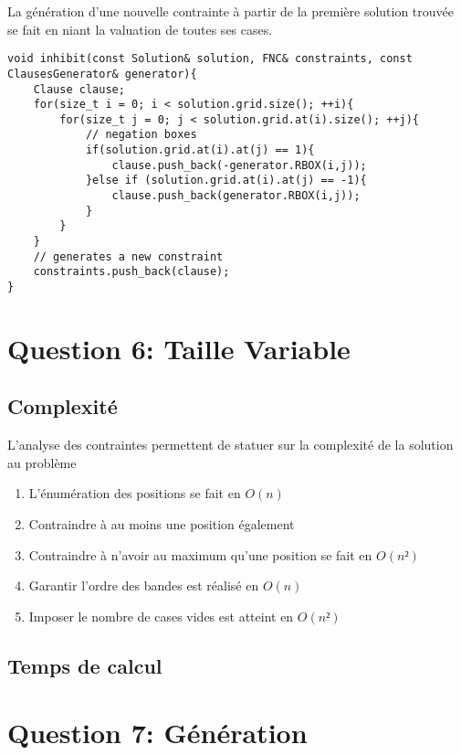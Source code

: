 \documentclass[a4paper,12pt]{report}
\begin{document}
La génération d'une nouvelle contrainte à partir de la première solution trouvée se fait en niant la valuation de toutes ses cases.
\lstset{style=Cpp, caption=Création de la contrainte, label=C:Constraint}
\begin{lstlisting}[mathescape=true]
void inhibit(const Solution& solution, FNC& constraints, const ClausesGenerator& generator){
	Clause clause;
	for(size_t i = 0; i < solution.grid.size(); ++i){
		for(size_t j = 0; j < solution.grid.at(i).size(); ++j){
			// negation boxes
			if(solution.grid.at(i).at(j) == 1){
				clause.push_back(-generator.RBOX(i,j));
			}else if (solution.grid.at(i).at(j) == -1){
				clause.push_back(generator.RBOX(i,j));
			}
		}
	}
	// generates a new constraint
	constraints.push_back(clause);
}
\end{lstlisting}

\chapter{Question 6: Taille Variable}
\section{Complexité}

L'analyse des contraintes permettent de statuer sur la complexité de la solution au problème

\begin{enumerate}
\item L'énumération des positions se fait en $O(n)$
\item Contraindre à au moins une position également
\item Contraindre à n'avoir au maximum qu'une position se fait en $O(n²)$
\item Garantir l'ordre des bandes est réalisé en $O(n)$
\item Imposer le nombre de cases vides est atteint en $O(n²)$
\end{enumerate}

\section{Temps de calcul}


\chapter{Question 7: Génération}
\end{document}
